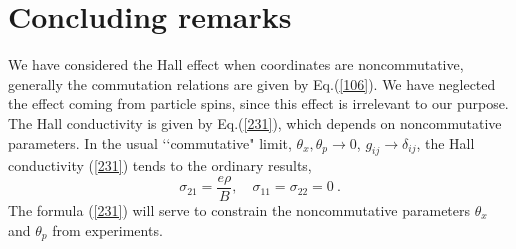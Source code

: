 \documentclass[a4paper,seceq]{ptptex}
\begin{document}
\section{Concluding remarks}
We have considered the Hall effect when coordinates are noncommutative,
generally the commutation relations are given by Eq.(\ref{106}).
We have neglected the effect coming from particle spins,
since this effect is irrelevant to our purpose.
The Hall conductivity is given by Eq.(\ref{231}),
which depends on noncommutative parameters.
In the usual \lq\lq commutative" limit,
$\theta _x, \theta _p \to 0$, $g_{ij} \to \delta _{ij}$,
the Hall conductivity (\ref{231}) tends to the ordinary results,
\begin{equation}
 \sigma _{21}=\frac{e\rho }{B}, \quad \sigma _{11}=\sigma _{22}=0~.
\label{401}
\end{equation}
The formula (\ref{231}) will serve to constrain
the noncommutative parameters  $\theta _x$ and $\theta _p$
from experiments.
\end{document}
